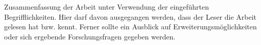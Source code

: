 Zusammenfassung der Arbeit unter Verwendung der eingeführten Begrifflichkeiten. Hier darf davon ausgegangen werden, dass der Leser die Arbeit gelesen hat bzw. kennt. Ferner sollte ein Ausblick auf Erweiterungsmöglichkeiten oder sich ergebende Forschungsfragen gegeben werden.
